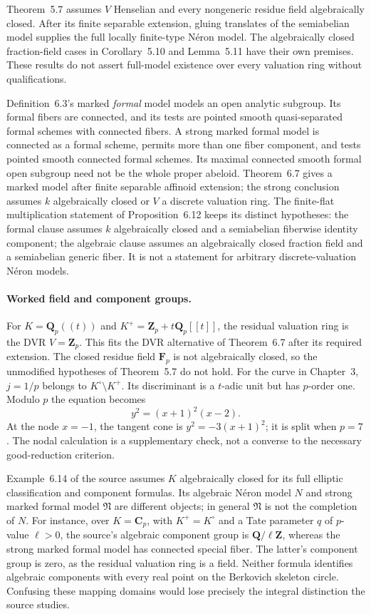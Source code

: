 Theorem~5.7 assumes $V$ Henselian and every nongeneric residue field
algebraically closed. After its finite separable extension, gluing
translates of the semiabelian model supplies the full locally finite-type
N\'eron model. The algebraically closed fraction-field cases in
Corollary~5.10 and Lemma~5.11 have their own premises. These results do not assert
full-model existence over every valuation ring without qualifications.

Definition~6.3's marked \emph{formal} model models an open analytic
subgroup. Its formal fibers are connected, and its tests are pointed
smooth quasi-separated formal schemes with connected fibers. A strong
marked formal model is connected as a formal scheme, permits more than
one fiber component, and tests pointed smooth connected formal schemes.
Its maximal connected smooth formal open subgroup need not be the whole
proper abeloid. Theorem~6.7 gives a marked model after finite separable
affinoid extension; the strong conclusion assumes $k$ algebraically
closed or $V$ a discrete valuation ring. The finite-flat multiplication
statement of Proposition~6.12 keeps its distinct hypotheses: the formal
clause assumes $k$ algebraically closed and a semiabelian fiberwise identity
component; the algebraic clause assumes an algebraically closed fraction
field and a semiabelian generic fiber. It is not a statement for arbitrary
discrete-valuation N\'eron models.

\paragraph{Worked field and component groups.}
For $K=\mathbf Q_p((t))$ and $K^+=\mathbf Z_p+t\mathbf Q_p[[t]]$,
the residual valuation ring is the DVR $V=\mathbf Z_p$.
This fits the DVR alternative of Theorem~6.7 after its required
extension. The closed residue field $\mathbf F_p$ is not algebraically
closed, so the unmodified hypotheses of Theorem~5.7 do not hold.
For the curve in Chapter~3, $j=1/p$ belongs to $K^\circ\setminus K^+$.
Its discriminant is a $t$-adic unit but has $p$-order one. Modulo $p$
the equation becomes
\[
 y^2=(x+1)^2(x-2).
\]
At the node $x=-1$, the tangent cone is $y^2=-3(x+1)^2$;
it is split when $p=7$. The nodal calculation is a supplementary
check, not a converse to the necessary good-reduction criterion.

Example~6.14 of the source assumes $K$ algebraically closed for its
full elliptic classification and component formulas. Its algebraic
N\'eron model $N$ and strong marked formal model $\mathfrak N$ are
different objects; in general $\mathfrak N$ is not the completion of
$N$. For instance, over $K=\mathbf C_p$, with $K^+=K^\circ$ and a
Tate parameter $q$ of $p$-value $\ell>0$, the source's algebraic
component group is $\mathbf Q/\ell\mathbf Z$, whereas the strong
marked formal model has connected special fiber. The latter's component
group is zero, as the residual valuation ring is a field.
Neither formula identifies algebraic components with every real point
on the Berkovich skeleton circle. Confusing these mapping domains
would lose precisely the integral distinction the source studies.

